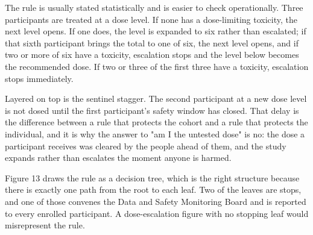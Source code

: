 The rule is usually stated statistically and is easier to check operationally.
Three participants are treated at a dose level. If none has a dose-limiting
toxicity, the next level opens. If one does, the level is expanded to six rather
than escalated; if that sixth participant brings the total to one of six, the
next level opens, and if two or more of six have a toxicity, escalation stops
and the level below becomes the recommended dose. If two or three of the first
three have a toxicity, escalation stops immediately.

Layered on top is the sentinel stagger. The second participant at a new dose
level is not dosed until the first participant's safety window has closed. That
delay is the difference between a rule that protects the cohort and a rule that
protects the individual, and it is why the answer to "am I the untested dose" is
no: the dose a participant receives was cleared by the people ahead of them, and
the study expands rather than escalates the moment anyone is harmed.

Figure 13 draws the rule as a decision tree, which is the right structure
because there is exactly one path from the root to each leaf. Two of the leaves
are stops, and one of those convenes the Data and Safety Monitoring Board and is
reported to every enrolled participant. A dose-escalation figure with no
stopping leaf would misrepresent the rule.


